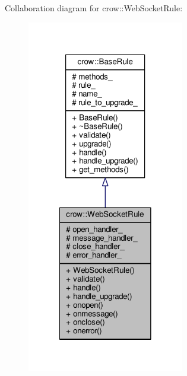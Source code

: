 Collaboration diagram for crow\-:\-:Web\-Socket\-Rule\-:
\nopagebreak
\begin{figure}[H]
\begin{center}
\leavevmode
\includegraphics[width=194pt]{classcrow_1_1_web_socket_rule__coll__graph}
\end{center}
\end{figure}
